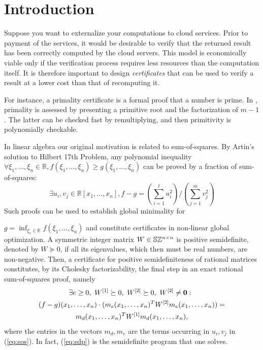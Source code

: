 \documentclass{article}
\newcommand{\category}[3]{}
\newcommand{\terms}[1]{}
\newcommand{\keywords}[1]{}
\newcommand{\R}{\ensuremath{\mathbb R}}
\newcommand{\sdp}{semidefinite program\xspace}
\newcommand{\psd}{positive semidefinite\xspace}
\newcommand{\psdness}{positive semidefiniteness\xspace}
\newcommand{\symm}[2]{\mathbb{S}#1^{#2\times #2}}
\newcommand{\sos}{sum-of-squares\xspace}
\begin{document}
{\small 
  \category{I.1.2 }{Computing Methodologies}{Symbolic and Algebraic Manipulation}
  \terms{Theory, algorithms, verification}
  \keywords{Randomization, probabilistic proof, matrix rank, matrix
    characteristic polynomial, \psdness, output validation, $\sum$-protocols,
    interactive certificate}
}

 
\section{Introduction}
Suppose you want to externalize your computations to
cloud services. Prior to payment of the services, it would be desirable
to verify that the returned result has been correctly computed by the cloud
servers. This model is economically viable only if the verification
process requires less resources than the computation itself.
It is therefore important to design {\em certificates} that can be
used to verify a result at a lower cost than that of recomputing it.

For instance, a primality certificate is a formal proof that a number
is prime. In \cite{Pratt:1975:primroot}, primality is assessed by
presenting a primitive root and the factorization of $m-1$.
The latter can be checked fast by remultiplying, and then primitivity
is polynomially checkable.

In linear algebra our original motivation is related to \sos.
By Artin's solution to Hilbert 17th Problem, any polynomial inequality
$\forall \xi_1,\ldots,\xi_n\in\R, f(\xi_1,\ldots,\xi_n)\geq
g(\xi_1,\ldots,\xi_n)$ can be proved by a fraction of \sos: 
\begin{equation}\label{eq:sos}
  \exists u_i, v_j \in \R[x_1,\ldots,x_n],
  f-g=\left(\sum_{i=1}^\ell u_i^2\right)/\left(\sum_{j=1}^m v_j^2\right)
\end{equation}
Such proofs can be used to establish global minimality for
 
$g = \inf_{\xi_v\in\R} f(\xi_1,\ldots,\xi_n)$ 
and constitute certificates in non-linear global optimization. 
A symmetric integer matrix $W\in \symm{\ZZ}{n}$ is \psd,
denoted by $W \succeq 0$, if all its eigenvalues, which then must be
real numbers, are non-negative. Then, a certificate for \psdness of rational
matrices constitutes, by its Cholesky factorizability, the final step
in an exact rational \sos proof, namely
\begin{multline}\label{eq:sdp} 
  \hspace*{-0.5em}\exists e\ge 0,\ W^{[1]}\succeq 0,\ W^{[2]} \succeq 0,\ W^{[2]}\neq \mathbf{0}:
  \\
  (f-g)(x_1,\ldots,x_n)\cdot(m_e(x_1,\ldots,x_n)^T W^{[2]}m_e(x_1,\ldots,x_n))=\\
  m_d(x_1,\ldots,x_n)^T W^{[1]}m_d(x_1,\ldots,x_n),
\end{multline}
where the entries in the vectors $m_d,m_e$ are the terms occurring in $u_i,v_j$
in
(\ref{eq:sos}).
In fact, (\ref{eq:sdp}) is the \sdp that one solves.
\end{document}
